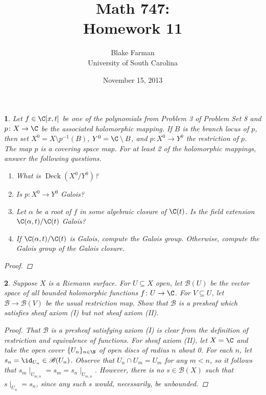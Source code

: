 \documentclass[10pt]{amsart}
\author{Blake Farman\\University of South Carolina}
\title{Math 747:\\Homework 11}
\date{November 15, 2013}
\begin{document}
\maketitle

\providecommand{\p}{\mathfrak{p}}
\providecommand{\m}{\mathfrak{m}}
\providecommand{\Deck}[1]{\operatorname{Deck}\left(#1\right)}

\newtheorem{thm}{}
\newtheorem{lem}{Lemma}
\newtheorem{prop}{Proposition}
\theoremstyle{definition}
\newtheorem{defn}{Definition}[thm]

\newcommand{\A}{\mathbb{A}}

\begin{thm}
  Let $f \in \C[x,t]$ be one of the polynomials from Problem 3 of Problem Set 8 and $p \colon X \rightarrow \C$ be the associated holomorphic mapping.
  If $B$ is the branch locus of $p$, then set $X^0 = X \setminus p^{-1}(B)$, $Y^0 = \C \setminus B$, and $p \colon X^0 \rightarrow Y^0$ the restriction of $p$.
  The map $p$ is a covering space map.
  For at least 2 of the holomorphic mappings, answer the following questions.
  \begin{enumerate}
  \item
    What is $\Deck{X^0/Y^0}$?
  \item
    Is $p \colon X^0 \rightarrow Y^0$ Galois?
  \item
    Let $\alpha$ be a root of $f$ in some algebraic closure of $\C(t)$.
    Is the field extension $\C(\alpha,t)/\C(t)$ Galois?
  \item
    If $\C(\alpha, t)/\C(t)$ is Galois, compute the Galois group.
    Otherwise, compute the Galois group of the Galois closure.
  \end{enumerate}
  \begin{proof}
  \end{proof}
\end{thm}

\begin{thm}
  Suppose $X$ is a Riemann surface.
  For $U \subseteq X$ open, let $\mathscr{B}(U)$ be the vector space of all bounded holomorphic functions $f \colon U \rightarrow \C$.
  For $V \subseteq U$, let $\mathscr{B} \rightarrow \mathscr{B}(V)$ be the usual restriction map.
  Show that $\mathscr{B}$ is a presheaf which satisfies sheaf axiom (I) but not sheaf axiom (II).

  \begin{proof}
    That $\mathscr{B}$ is a presheaf satisfying axiom (I) is clear from the definition of restriction and equivalence of functions.
    For sheaf axiom (II), let $X = \C$ and take the open cover $\{U_n\}_{n \in \N}$ of open discs of radius $n$ about 0.
    For each $n$, let $s_n = \id_{U_n} \in \mathscr{B}(U_n)$.
    Observe that $U_n \cap U_m = U_m$ for any $m < n$, so it follows that $s_m\mid_{U_{m,n}} = s_m = s_n\mid_{U_{m,n}}$.
    However, there is no $s \in \mathscr{B}(X)$ such that $s \mid_{U_n} = s_n$, since any such $s$ would, necessarily, be unbounded.
  \end{proof}
\end{thm}
\end{document}
